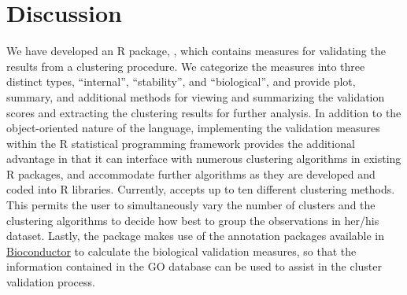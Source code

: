 \documentclass[11pt]{article}
\begin{document}
\section{Discussion}
\label{sec:discussion}

We have developed an R package, , which contains measures
for validating the results from a clustering procedure.  We categorize
the measures into three distinct types, ``internal'', ``stability'',
and ``biological'', and provide plot, summary, and additional methods
for viewing and summarizing the validation scores and extracting the
clustering results for further analysis.  
In addition to the object-oriented nature of the language, 
implementing the validation measures
within the R statistical programming framework provides the additional
advantage in that it can 
interface with numerous clustering algorithms in existing R packages,
and accommodate further algorithms as they are developed and coded into
R libraries.  Currently,  accepts up to ten different
clustering methods.  This permits the user to simultaneously vary the
number of clusters and the clustering algorithms to decide how best to
group the observations in her/his dataset.  Lastly, the package makes
use of  the annotation packages
available in \href{http://www.bioconductor.org/}{Bioconductor} to
calculate the biological validation measures, so that the information
contained in the GO database can be used to assist in the cluster
validation process.

\end{document}
